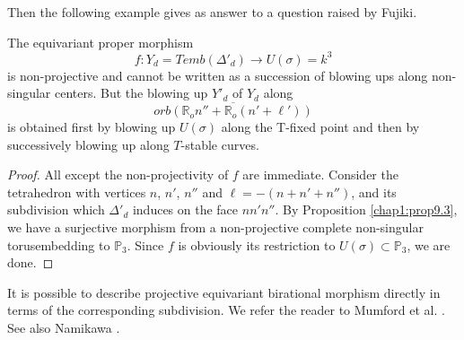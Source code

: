 Then the following example gives as answer to a question raised by
Fujiki. 

\setcounter{coro}{4}
\begin{coro}\label{chap1:coro9.5}%
The equivariant proper morphism
$$
f : Y_d = Temb(\Delta'_{d}) \to U(\sigma) = k^3
$$
is non-projective and cannot be written as a succession of blowing ups
along non-singular centers. But the blowing up $Y'_{d}$ of $Y_d$ along
$$\overline{orb(\mathbb{R}_on'' + \mathbb{R}_o(n' + \ell'))}$$ 
is obtained first by blowing up $U(\sigma)$ along the T-fixed point and
then by successively blowing up along $T$-stable curves.  
\end{coro} 

\begin{proof}%
All except the non-projectivity of $f$ are immediate. Consider the
tetrahedron with vertices $n$, $n'$, $n''$ and $\ell = -(n + n' + n'')$, and
its subdivision which $\Delta'_{d}$ induces on the face $nn'n''$. By
Proposition \ref{chap1:prop9.3}, we have a surjective morphism from a
non-projective 
complete non-singular torus\pageoriginale embedding to
$\mathbb{P}_3$. Since $f$ is obviously its restriction to
$U(\sigma)\subset\mathbb{P}_3$, we are done.  
\end{proof}

It is possible to describe projective equivariant birational morphism
directly in terms of the corresponding subdivision. We refer the
reader to Mumford et al. \cite[Chap. III, p. 152-154 in
  particular]{keyTE}. See also Namikawa \cite{keyN6}. 

